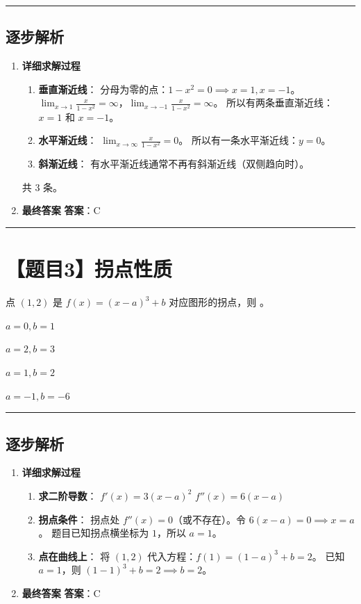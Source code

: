 \documentclass[UTF8]{ctexart}
\newenvironment{redenv}{\color{red}}{}
\newenvironment{detailedanalysis}{%
    \color{red}
    \begin{enumerate}[label=\textbf{第\arabic*步：}, leftmargin=*, align=left, itemsep=1.5ex]
}{%
    \end{enumerate}
}
\newcommand{\problemrule}{\noindent\rule{\textwidth}{1.5pt}\vspace{-0.8em}}
\newcommand{\analysisrule}{\noindent\rule{\textwidth}{0.8pt}\vspace{-0.8em}}
\newcommand{\choicesFour}[4]{
    \begin{enumerate}[label=\Alph*., itemsep=0pt, parsep=0pt, topsep=5pt, labelsep=0.5em]
        \begin{minipage}{0.22\linewidth} \item #1 \end{minipage}
        \begin{minipage}{0.22\linewidth} \item #2 \end{minipage}
        \begin{minipage}{0.22\linewidth} \item #3 \end{minipage}
        \begin{minipage}{0.22\linewidth} \item #4 \end{minipage}
    \end{enumerate}
}
\newcommand{\blank}[1]{\underline{\hspace{#1}}}
\begin{document}
\begin{redenv}
\analysisrule
\subsection*{逐步解析}

\begin{detailedanalysis}
\item \textbf{详细求解过程}
\begin{enumerate}[label=(\arabic*)]
\item \textbf{垂直渐近线}：
分母为零的点：$1 - x^2 = 0 \implies x = 1, x = -1$。
$\lim_{x \to 1} \frac{x}{1-x^2} = \infty$，$\lim_{x \to -1} \frac{x}{1-x^2} = \infty$。
所以有两条垂直渐近线：$x=1$ 和 $x=-1$。
\item \textbf{水平渐近线}：
$\lim_{x \to \infty} \frac{x}{1-x^2} = 0$。
所以有一条水平渐近线：$y=0$。
\item \textbf{斜渐近线}：
有水平渐近线通常不再有斜渐近线（双侧趋向时）。
\end{enumerate}
共 3 条。

\item \textbf{最终答案}
\textbf{答案}：C
\end{detailedanalysis}
\end{redenv}

\problemrule
\section*{【题目3】拐点性质}
点 $(1,2)$ 是 $ f(x)=(x-a)^{3}+b $ 对应图形的拐点，则 \blank{1cm}。
\choicesFour{$ a=0,b=1 $}{$ a=2,b=3 $}{$ a=1,b=2 $}{$ a=-1,b=-6 $}

\begin{redenv}
\analysisrule
\subsection*{逐步解析}

\begin{detailedanalysis}
\item \textbf{详细求解过程}
\begin{enumerate}[label=(\arabic*)]
\item \textbf{求二阶导数}：
$f'(x) = 3(x-a)^2$
$f''(x) = 6(x-a)$
\item \textbf{拐点条件}：
拐点处 $f''(x)=0$（或不存在）。令 $6(x-a)=0 \implies x=a$。
题目已知拐点横坐标为 $1$，所以 $a=1$。
\item \textbf{点在曲线上}：
将 $(1,2)$ 代入方程：$f(1) = (1-a)^3 + b = 2$。
已知 $a=1$，则 $(1-1)^3 + b = 2 \implies b = 2$。
\end{enumerate}

\item \textbf{最终答案}
\textbf{答案}：C
\end{detailedanalysis}
\end{redenv}
\end{document}
